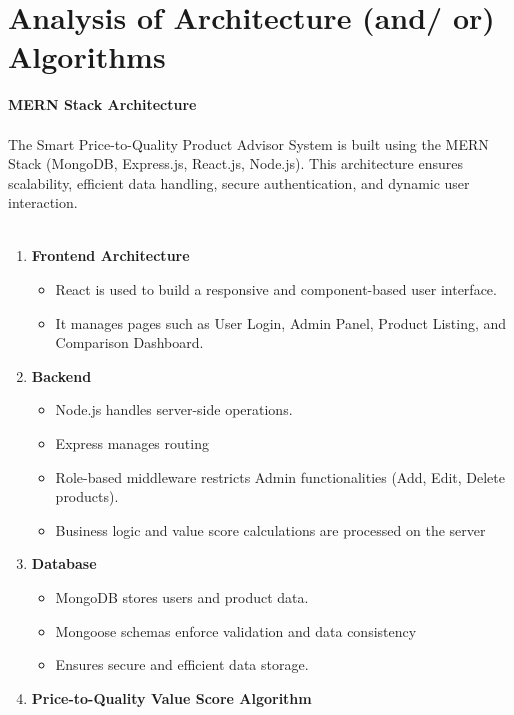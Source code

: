 \newpage
\section{Analysis of Architecture (and/ or) Algorithms}
{\large \textbf{MERN Stack Architecture}}\\\\
The Smart Price-to-Quality Product Advisor System is built using the MERN Stack (MongoDB, Express.js, React.js, Node.js). This architecture ensures scalability, efficient data handling, secure authentication, and dynamic user interaction.\\\\
\begin{enumerate}
    \item \textbf{ Frontend Architecture}
    \begin{itemize}
        \item React is used to build a responsive and component-based user interface.
        \item It manages pages such as User Login, Admin Panel, Product Listing, and Comparison Dashboard.
    \end{itemize}
    \item \textbf{Backend}
    \begin{itemize}
        \item Node.js handles server-side operations.
        \item Express manages routing
        \item Role-based middleware restricts Admin functionalities (Add, Edit, Delete products).

        \item Business logic and value score calculations are processed on the server
    \end{itemize}
    \item \textbf{Database}
    \begin{itemize}
        \item MongoDB stores users and product data.
        \item Mongoose schemas enforce validation and data consistency
        \item Ensures secure and efficient data storage.
    \end{itemize}
    \item \textbf{Price-to-Quality Value Score Algorithm}
  

\end{enumerate}

